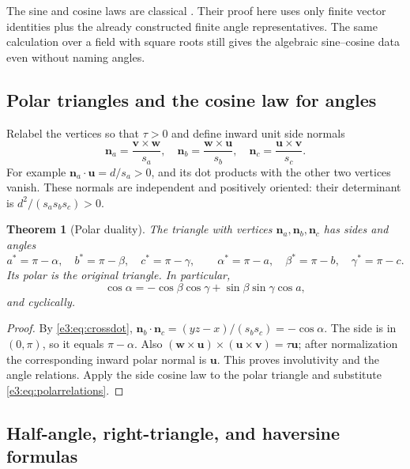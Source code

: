 \documentclass[11pt,letterpaper]{article}
\numberwithin{equation}{section}
\newtheorem{theorem}{Theorem}[section]
\theoremstyle{definition}
\theoremstyle{remark}
\newcommand{\vv}[1]{\bm{#1}}
\begin{document}
The sine and cosine laws are classical \cite[\S4.42(iii)]{DLMF}. Their
proof here uses only finite vector identities plus the already constructed
finite angle representatives. The same calculation over a field with square
roots still gives the algebraic sine--cosine data even without naming angles.

\subsection{Polar triangles and the cosine law for angles}\label{e3:subsec:polar}

Relabel the vertices so that $\tau>0$ and define inward unit side normals
\begin{equation}\label{e3:eq:polarnormals}
 \vv n_a=\frac{\vv v\times\vv w}{s_a},\quad
 \vv n_b=\frac{\vv w\times\vv u}{s_b},\quad
 \vv n_c=\frac{\vv u\times\vv v}{s_c}.
\end{equation}
For example $\vv n_a\cdot\vv u=d/s_a>0$, and its dot products with the
other two vertices vanish. These normals are independent and positively
oriented: their determinant is $d^2/(s_as_bs_c)>0$.

\begin{theorem}[Polar duality]\label{e3:thm:polar}
The triangle with vertices $\vv n_a,\vv n_b,\vv n_c$ has sides and angles
\begin{equation}\label{e3:eq:polarrelations}
 a^*=\pi-\alpha,\quad b^*=\pi-\beta,\quad c^*=\pi-\gamma,
 \qquad
 \alpha^*=\pi-a,\quad\beta^*=\pi-b,\quad\gamma^*=\pi-c.
\end{equation}
Its polar is the original triangle. In particular,
\begin{equation}\label{e3:eq:anglecosine}
 \cos\alpha=-\cos\beta\cos\gamma+
                 \sin\beta\sin\gamma\cos a,
\end{equation}
and cyclically.
\end{theorem}
\begin{proof}
By \cref{e3:eq:crossdot},
$\vv n_b\cdot\vv n_c=(yz-x)/(s_bs_c)=-\cos\alpha$.
The side is in $(0,\pi)$, so it equals $\pi-\alpha$.
Also
$(\vv w\times\vv u)\times(\vv u\times\vv v)=\tau\vv u$;
after normalization the corresponding inward polar normal is $\vv u$.
This proves involutivity and the angle relations. Apply the side cosine law
to the polar triangle and substitute \cref{e3:eq:polarrelations}.
\end{proof}

\subsection{Half-angle, right-triangle, and haversine formulas}
\end{document}
